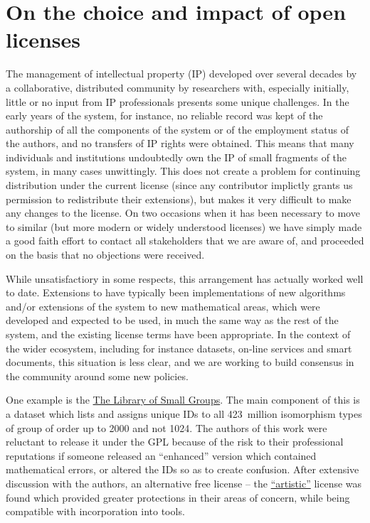 \documentclass{deliverablereport}
\begin{document}

\section{On the choice and impact of open licenses}



The management of intellectual property (IP) developed over several
decades
by a collaborative, distributed community by researchers with,
especially initially, little or no input from IP professionals
presents some unique challenges. In the early years of the \GAP
system, for instance, no reliable record was kept of the authorship of
all the components of the system or of the employment status of the
authors, and no transfers of IP rights were obtained. This means that
many individuals and institutions undoubtedly own the IP of small
fragments of the system, in many cases unwittingly.
This does not create a problem for continuing
distribution under the current license (since any contributor
implictly grants us permission to redistribute their
extensions), but makes it very difficult to make any changes to the
license. On two occasions when it has been necessary to move to
similar (but more modern or widely understood licenses) we have simply
made a good faith effort to contact all stakeholders that we are aware
of, and proceeded on the basis that no objections were received.

While unsatisfactiory in some respects, this arrangement has actually
worked well to date. Extensions to \GAP have typically been
implementations of new algorithms and/or extensions of the system to
new mathematical areas, which were developed and expected to be used,
in much the same way as the rest of the system, and the existing
license terms have been appropriate. In the context of the wider \ODK
ecosystem, including for instance datasets, on-line services and smart
documents, this situation is less clear, and we are working to build
consensus in the \GAP community around some new policies.

One example is the \href{???}{The Library of Small Groups}. The main
component of this is a dataset which lists and assigns unique IDs to
all 423~million isomorphism types of group of
order up to 2000 and not 1024. The
authors of this work were reluctant to release it under the GPL
because of the risk to their professional reputations if someone
released an ``enhanced'' version which contained mathematical errors,
or altered the IDs so as to create confusion. After extensive
discussion with the authors, an alternative free license -- the
\href{???}{``artistic''} license was found which provided greater
protections in their areas of concern, while being compatible with
incorporation into \ODK tools.
\end{document}
